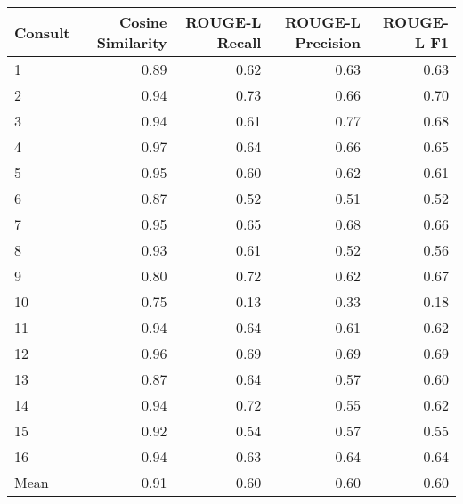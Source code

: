 \begin{tabular}{lrrrr}
\toprule
Consult & Cosine Similarity & ROUGE-L Recall & ROUGE-L Precision & ROUGE-L F1 \\
\midrule
1 & 0.89 & 0.62 & 0.63 & 0.63 \\
2 & 0.94 & 0.73 & 0.66 & 0.70 \\
3 & 0.94 & 0.61 & 0.77 & 0.68 \\
4 & 0.97 & 0.64 & 0.66 & 0.65 \\
5 & 0.95 & 0.60 & 0.62 & 0.61 \\
6 & 0.87 & 0.52 & 0.51 & 0.52 \\
7 & 0.95 & 0.65 & 0.68 & 0.66 \\
8 & 0.93 & 0.61 & 0.52 & 0.56 \\
9 & 0.80 & 0.72 & 0.62 & 0.67 \\
10 & 0.75 & 0.13 & 0.33 & 0.18 \\
11 & 0.94 & 0.64 & 0.61 & 0.62 \\
12 & 0.96 & 0.69 & 0.69 & 0.69 \\
13 & 0.87 & 0.64 & 0.57 & 0.60 \\
14 & 0.94 & 0.72 & 0.55 & 0.62 \\
15 & 0.92 & 0.54 & 0.57 & 0.55 \\
16 & 0.94 & 0.63 & 0.64 & 0.64 \\
Mean & 0.91 & 0.60 & 0.60 & 0.60 \\
\bottomrule
\end{tabular}
